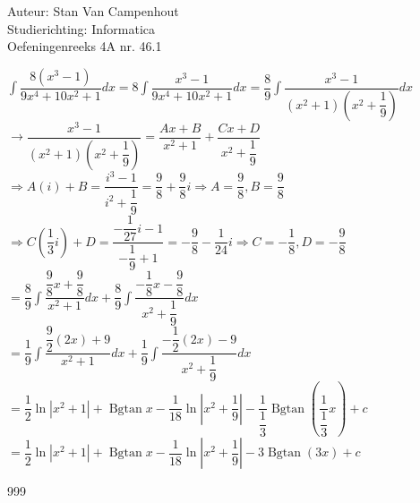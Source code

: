 \documentclass[a4paper]{article}
\begin{document}
  
\noindent \large Auteur: Stan Van Campenhout \\
\noindent \large Studierichting:  Informatica\\
\noindent \large Oefeningenreeks 4A nr. 46.1\\

\medskip

\normalsize

$ \displaystyle\int\dfrac{8\left(x^3-1\right)}{9x^4+10x^2+1}dx = 8\displaystyle\int\dfrac{x^3-1}{9x^4+10x^2+1}dx 
= \dfrac{8}{9}\displaystyle\int\dfrac{x^3-1}{\left(x^2+1\right)\left(x^2+\dfrac{1}{9}\right)}dx $\\

$ \rightarrow \dfrac{x^3-1}{\left(x^2+1\right)\left(x^2+\dfrac{1}{9}\right)} = \dfrac{Ax+B}{x^2+1}+\dfrac{Cx+D}{x^2+\dfrac{1}{9}} $\\

$ \Rightarrow A\left(i\right)+B = \dfrac{i^3-1}{i^2+\dfrac{1}{9}} = \dfrac{9}{8}+\dfrac{9}{8}i \Rightarrow A = \dfrac{9}{8}, B = \dfrac{9}{8} $\\

$ \Rightarrow C\left(\dfrac{1}{3}i\right)+D = \dfrac{-\dfrac{1}{27}i-1}{-\dfrac{1}{9}+1} = -\dfrac{9}{8}-\dfrac{1}{24}i \Rightarrow C = -\dfrac{1}{8}, D = -\dfrac{9}{8} $\\

$ = \dfrac{8}{9}\displaystyle\int\dfrac{\dfrac{9}{8}x+\dfrac{9}{8}}{x^2+1}dx+\dfrac{8}{9}\displaystyle\int\dfrac{-\dfrac{1}{8}x-\dfrac{9}{8}}{x^2+\dfrac{1}{9}}dx $\\

$ = \dfrac{1}{9}\displaystyle\int\dfrac{\dfrac{9}{2}\left(2x\right)+9}{x^2+1}dx + \dfrac{1}{9}\displaystyle\int\dfrac{-\dfrac{1}{2}\left(2x\right)-9}{x^2+\dfrac{1}{9}}dx $\\

$ = \dfrac{1}{2}\ln|x^2+1|+\operatorname{Bgtan}x-\dfrac{1}{18}\ln\left|x^2+\dfrac{1}{9}\right|-\dfrac{1}{\dfrac{1}{3}}\operatorname{Bgtan}\left(\dfrac{1}{\dfrac{1}{3}}x\right)+c $\\

$ = \dfrac{1}{2}\ln|x^2+1|+\operatorname{Bgtan}x-\dfrac{1}{18}\ln\left|x^2+\dfrac{1}{9}\right|-3\operatorname{Bgtan}\left(3x\right)+c $\\

\begin{thebibliography}{999}
\end{thebibliography}
\end{document}
